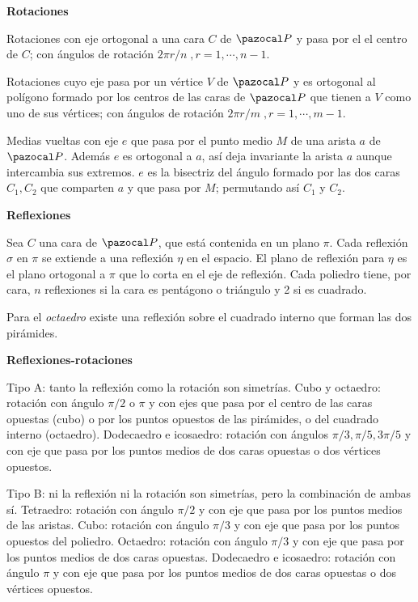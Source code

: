 \textbf{Rotaciones}
\begin{itemizex}
	\item Rotaciones con eje ortogonal a una cara $C$ de $\PP$ y pasa por el el centro de $C$; con ángulos de rotación $2\pi r/n\;,r = 1, \cdots, n-1$.
	\item Rotaciones cuyo eje pasa por un vértice $V$ de $\PP$ y es ortogonal al polígono formado por los centros de las caras de $\PP$ que tienen a $V$ como uno de sus vértices; con ángulos de rotación $2\pi r/m\;,r = 1, \cdots, m-1$.
	\item Medias vueltas con eje $e$ que pasa por el punto medio $M$ de una arista $a$ de $\PP$. Además $e$ es ortogonal a $a$, así deja invariante la arista $a$ aunque intercambia sus extremos. $e$ es la bisectriz del ángulo formado por las dos caras $C_1, C_2$ que comparten $a$ y que pasa por $M$; permutando así $C_1$ y $C_2$.
\end{itemizex}

\textbf{Reflexiones}
\begin{itemizex}
	\item Sea $C$ una cara de $\PP$, que está contenida en un plano $\pi$.
	Cada reflexión $\sigma$ en $\pi$ se extiende a una reflexión $\eta$ en el espacio. El plano de reflexión para $\eta$ es el plano ortogonal a $\pi$ que lo corta en el eje de reflexión. Cada poliedro tiene, por cara, $n$ reflexiones si la cara es pentágono o triángulo y 2 si es cuadrado.
	\item Para el \textit{octaedro} existe una reflexión sobre el cuadrado interno que forman las dos pirámides.
\end{itemizex}

\textbf{Reflexiones-rotaciones}
\begin{itemizex}
	\item Tipo A: tanto la reflexión como la rotación son simetrías. 
		\subitem Cubo y octaedro: rotación con ángulo $\pi/2$ o $\pi$ y con ejes que pasa por el centro de las caras opuestas (cubo) o por los puntos opuestos de las pirámides, o del cuadrado interno (octaedro).
		\subitem Dodecaedro e icosaedro: rotación con ángulos $\pi/3, \pi/5, 3\pi/5$ y con eje que pasa por los puntos medios de dos caras opuestas o dos vértices opuestos.
	\item Tipo B: ni la reflexión ni la rotación son simetrías, pero la combinación de ambas sí.
		\subitem Tetraedro: rotación con ángulo $\pi/2$ y con eje que pasa por los puntos medios de las aristas.
		\subitem Cubo: rotación con ángulo $\pi/3$ y con eje que pasa por los puntos opuestos del poliedro.
		\subitem Octaedro: rotación con ángulo $\pi/3$ y con eje que pasa por los puntos medios de dos caras opuestas.
		\subitem Dodecaedro e icosaedro: rotación con ángulo $\pi$ y con eje que pasa por los puntos medios de dos caras opuestas o dos vértices opuestos.
\end{itemizex}